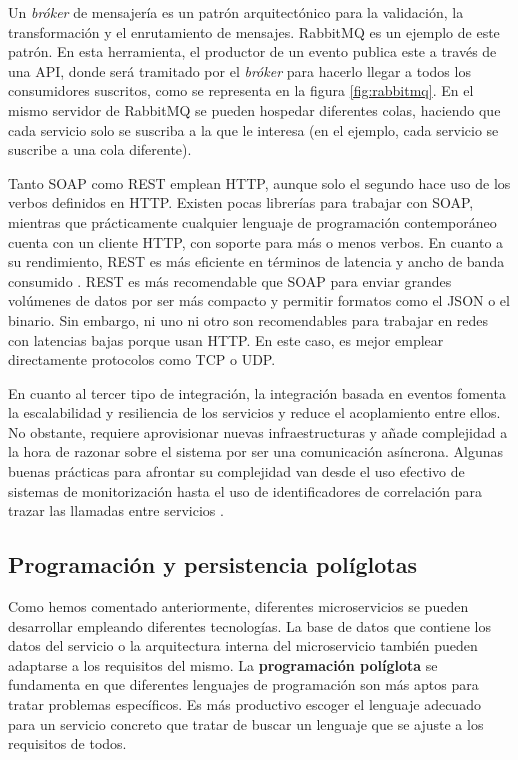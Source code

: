 \documentclass[11pt,spanish,listoffigures]{tfgetsinf}
\begin{document}
\begin{itemize}
Un \textit{bróker} de mensajería es un patrón arquitectónico para la validación, la transformación y el enrutamiento de mensajes. RabbitMQ es un ejemplo de este patrón. En esta herramienta, el productor de un evento publica este a través de una API, donde será tramitado por el \textit{bróker} para hacerlo llegar a todos los consumidores suscritos, como se representa en la figura \ref{fig:rabbitmq}. En el mismo servidor de RabbitMQ se pueden hospedar diferentes colas, haciendo que cada servicio solo se suscriba a la que le interesa (en el ejemplo, cada servicio se suscribe a una cola diferente).
 
\end{itemize}

Tanto SOAP como REST emplean HTTP, aunque solo el segundo hace uso de los verbos definidos en HTTP. Existen pocas librerías para trabajar con SOAP, mientras que prácticamente cualquier lenguaje de programación contemporáneo cuenta con un cliente HTTP, con soporte para más o menos verbos. En cuanto a su rendimiento, REST es más eficiente en términos de latencia y ancho de banda consumido \cite{Mulligan}. REST es más recomendable que SOAP para enviar grandes volúmenes de datos por ser más compacto y permitir formatos como el JSON o el binario. Sin embargo, ni uno ni otro son recomendables para trabajar en redes con latencias bajas porque usan HTTP. En este caso, es mejor emplear directamente protocolos como TCP o UDP. 

En cuanto al tercer tipo de integración, la integración basada en eventos fomenta la escalabilidad y resiliencia de los servicios y reduce el acoplamiento entre ellos. No obstante, requiere aprovisionar nuevas infraestructuras y añade complejidad a la hora de razonar sobre el sistema por ser una comunicación asíncrona. Algunas buenas prácticas para afrontar su complejidad van desde el uso efectivo de sistemas de monitorización hasta el uso de identificadores de correlación para trazar las llamadas entre servicios \cite{Newman2015a}. 

\subsection{Programación y persistencia políglotas} \label{subsec:Poliglota}

Como hemos comentado anteriormente, diferentes microservicios se pueden desarrollar empleando diferentes tecnologías. La base de datos que contiene los datos del servicio o la arquitectura interna del microservicio también pueden adaptarse a los requisitos del mismo. La \textbf{programación políglota} \cite{DelaTorre2018} se fundamenta en que diferentes lenguajes de programación son más aptos para tratar problemas específicos. Es más productivo escoger el lenguaje adecuado para un servicio concreto que tratar de buscar un lenguaje que se ajuste a los requisitos de todos.
\end{document}
